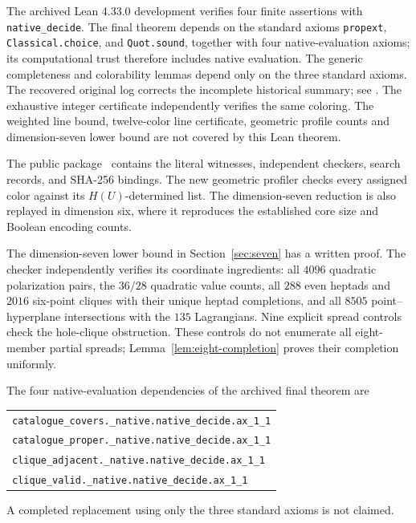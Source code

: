 The archived Lean 4.33.0 development verifies four finite assertions with
\texttt{native\_decide}. The final theorem depends on the standard axioms
\texttt{propext}, \texttt{Classical.choice}, and \texttt{Quot.sound}, together
with four native-evaluation axioms; its computational trust therefore includes
native evaluation. The generic completeness and colorability lemmas depend
only on the three standard axioms. The recovered original log corrects the
incomplete historical summary; see .
The exhaustive integer certificate independently verifies the same coloring.
The weighted line bound, twelve-color line certificate, geometric profile
counts and dimension-seven lower bound
are not covered by this Lean theorem.

The public package~\cite{Package} contains the literal witnesses, independent
checkers, search records, and SHA-256 bindings. The new geometric profiler
checks every assigned color against its $H(U)$-determined list. The
dimension-seven reduction is also replayed in dimension six, where it
reproduces the established core size and Boolean encoding counts.

The dimension-seven lower bound in Section~\ref{sec:seven} has a
written proof. The checker
independently verifies its coordinate ingredients: all $4096$ quadratic
polarization pairs, the $36/28$ quadratic value counts, all $288$ even
heptads and $2016$ six-point cliques with their unique heptad completions,
and all $8505$ point--hyperplane intersections with the $135$ Lagrangians.
Nine explicit spread controls check the hole-clique obstruction.
These controls do not enumerate all eight-member partial spreads;
Lemma~\ref{lem:eight-completion} proves their completion uniformly.

The four native-evaluation dependencies of the archived final theorem are
\begin{center}
\begin{tabular}{l}
\texttt{catalogue\_covers.\_native.native\_decide.ax\_1\_1}\\
\texttt{catalogue\_proper.\_native.native\_decide.ax\_1\_1}\\
\texttt{clique\_adjacent.\_native.native\_decide.ax\_1\_1}\\
\texttt{clique\_valid.\_native.native\_decide.ax\_1\_1}
\end{tabular}
\end{center}
A completed replacement using only the three standard axioms is not claimed.
